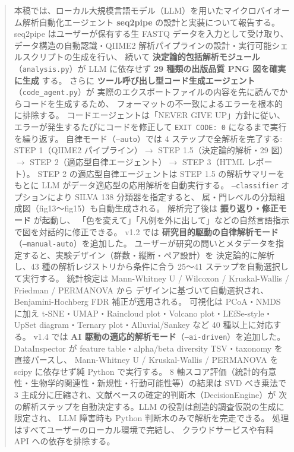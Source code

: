 \documentclass[12pt, a4paper]{article}
\begin{document}
\begin{abstract}
本稿では、ローカル大規模言語モデル（LLM）を用いたマイクロバイオーム解析自動化エージェント
\textbf{seq2pipe} の設計と実装について報告する。
seq2pipe はユーザーが保有する生 FASTQ データを入力として受け取り、
データ構造の自動認識・QIIME2 解析パイプラインの設計・実行可能シェルスクリプトの生成を行い、
続いて \textbf{決定論的包括解析モジュール}（\texttt{analysis.py}）が
LLM に依存せず \textbf{29 種類の出版品質 PNG 図を確実に生成} する。
さらに \textbf{ツール呼び出し型コード生成エージェント}（\texttt{code\_agent.py}）が
実際のエクスポートファイルの内容を先に読んでからコードを生成するため、
フォーマットの不一致によるエラーを根本的に排除する。
コードエージェントは「NEVER GIVE UP」方針に従い、
エラーが発生するたびにコードを修正して \texttt{EXIT CODE: 0} になるまで実行を繰り返す。
自律モード（\texttt{--auto}）では 4 ステップで全解析を完了する:
STEP 1（QIIME2 パイプライン）$\to$ STEP 1.5（決定論的解析・29 図）$\to$ STEP 2（適応型自律エージェント）$\to$ STEP 3（HTML レポート）。
STEP 2 の適応型自律エージェントは STEP 1.5 の解析サマリーをもとに LLM がデータ適応型の応用解析を自動実行する。
\texttt{--classifier} オプションにより SILVA 138 分類器を指定すると、
属・門レベルの分類組成図（fig13〜fig15）も自動生成される。
解析完了後は \textbf{振り返り・修正モード} が起動し、
「色を変えて」「凡例を外に出して」などの自然言語指示で図を対話的に修正できる。
v1.2 では \textbf{研究目的駆動の自律解析モード}（\texttt{--manual-auto}）を追加した。
ユーザーが研究の問いとメタデータを指定すると、実験デザイン（群数・縦断・ペア設計）を
決定論的に解析し、43 種の解析レジストリから条件に合う 25〜41 ステップを自動選択して実行する。
統計検定は Mann-Whitney U / Wilcoxon / Kruskal-Wallis / Friedman / PERMANOVA から
デザインに基づいて自動選択され、Benjamini-Hochberg FDR 補正が適用される。
可視化は PCoA・NMDS に加え t-SNE・UMAP・Raincloud plot・Volcano plot・LEfSe-style・
UpSet diagram・Ternary plot・Alluvial/Sankey など 40 種以上に対応する。
v1.4 では \textbf{AI 駆動の適応的解析モード}（\texttt{--ai-driven}）を追加した。
DataInspector が feature table・alpha/beta diversity TSV・taxonomy を直接パースし、
Mann-Whitney U / Kruskal-Wallis / PERMANOVA を scipy に依存せず純 Python で実行する。
8 軸スコア評価（統計的有意性・生物学的関連性・新規性・行動可能性等）の結果は
SVD べき乗法で 3 主成分に圧縮され、文献ベースの確定的判断木（DecisionEngine）が
次の解析ステップを自動決定する。LLM の役割は創造的調査仮説の生成に限定され、
LLM 障害時も Python 判断木のみで解析を完走できる。
処理はすべてユーザーのローカル環境で完結し、
クラウドサービスや有料 API への依存を排除する。
\end{abstract}
\end{document}
